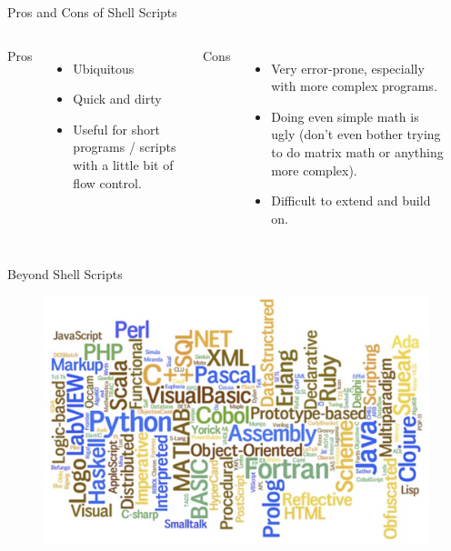 \documentclass[aspectratio=169]{beamer}
\begin{document}
    \begin{frame}{Pros and Cons of Shell Scripts}
        \begin{columns}
            Pros
            \begin{itemize}
                \item Ubiquitous
                \item Quick and dirty
                \item Useful for short programs / scripts with a little bit of flow control.
            \end{itemize}

            Cons

            \begin{itemize}
                \item Very error-prone, especially with more complex programs.
                \item Doing even simple math is ugly (don’t even bother trying to do matrix math or anything more complex).
                \item Difficult to extend and build on.
            \end{itemize}


            \inputminted{bash}{code/9_expr.sh}

        \end{columns}

    \end{frame}

    \begin{frame}{Beyond Shell Scripts}
        \begin{figure}
            \centering
            \includegraphics[width=0.6\linewidth]{lectures/figures/9_programming_languages.png}
        \end{figure}
    \end{frame}
\end{document}
